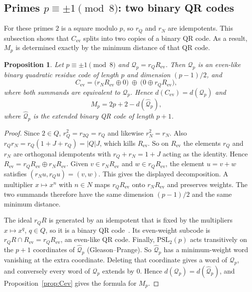\documentclass[12pt,letterpaper]{article}
\newtheorem{proposition}[theorem]{Proposition}
\theoremstyle{definition}
\theoremstyle{remark}
\numberwithin{equation}{section}
\newcommand{\Cev}{C_{\mathrm{ev}}}
\begin{document}
\subsection{\texorpdfstring{Primes $p\equiv\pm1\pmod 8$: two binary QR codes}{Primes p = +-1 (mod 8): two binary QR codes}}

For these primes $2$ is a square modulo $p$, so $r_Q$ and $r_N$ are idempotents.
This subsection shows that $\Cev$ splits into two copies of a binary QR code. As a
result, $M_p$ is determined exactly by the minimum distance of that QR code.

\begin{proposition}\label{prop:pm1}
Let $p\equiv\pm1\pmod8$ and $\mathcal Q_p=r_QR_{\mathrm{ev}}$. Then $\mathcal Q_p$
is an even-like binary quadratic residue code of length $p$ and dimension
$(p-1)/2$, and
\[
\Cev=\big(r_NR_{\mathrm{ev}}\oplus 0\big)\ \oplus\ \big(0\oplus r_QR_{\mathrm{ev}}\big),
\]
where both summands are equivalent to $\mathcal Q_p$. Hence $d(\Cev)=d(\mathcal Q_p)$
and
\[
M_p=2p+2-d(\widehat{\mathcal Q}_p),
\]
where $\widehat{\mathcal Q}_p$ is the extended binary QR code of length $p+1$.
\end{proposition}

\begin{proof}
Since $2\in Q$, $r_Q^2=r_{2Q}=r_Q$ and likewise $r_N^2=r_N$. Also
$r_Qr_N=r_Q(1+J+r_Q)=|Q|J$, which kills $R_{\mathrm{ev}}$. So on $R_{\mathrm{ev}}$
the elements $r_Q$ and $r_N$ are orthogonal idempotents with $r_Q+r_N=1+J$ acting as
the identity. Hence $R_{\mathrm{ev}}=r_QR_{\mathrm{ev}}\oplus r_NR_{\mathrm{ev}}$.
Given $v\in r_NR_{\mathrm{ev}}$ and $w\in r_QR_{\mathrm{ev}}$, the element $u=v+w$
satisfies $(r_Nu,r_Qu)=(v,w)$. This gives the displayed decomposition. A multiplier
$x\mapsto x^n$ with $n\in N$ maps $r_QR_{\mathrm{ev}}$ onto $r_NR_{\mathrm{ev}}$
and preserves weights. The two summands therefore have the same dimension $(p-1)/2$
and the same minimum distance.

The ideal $r_QR$ is generated by an idempotent that is fixed by the multipliers
$x\mapsto x^q$, $q\in Q$, so it is a binary QR code~\cite[\S6.6]{HP03}. Its
even-weight subcode is $r_QR\cap R_{\mathrm{ev}}=r_QR_{\mathrm{ev}}$, an even-like
QR code. Finally, $\mathrm{PSL}_2(p)$ acts transitively on the $p+1$ coordinates of
$\widehat{\mathcal Q}_p$ (Gleason--Prange). So $\widehat{\mathcal Q}_p$ has a
minimum-weight word vanishing at the extra coordinate. Deleting that coordinate
gives a word of $\mathcal Q_p$, and conversely every word of $\mathcal Q_p$ extends
by $0$. Hence $d(\mathcal Q_p)=d(\widehat{\mathcal Q}_p)$, and
Proposition~\ref{prop:Cev} gives the formula for $M_p$.
\end{proof}
\end{document}
